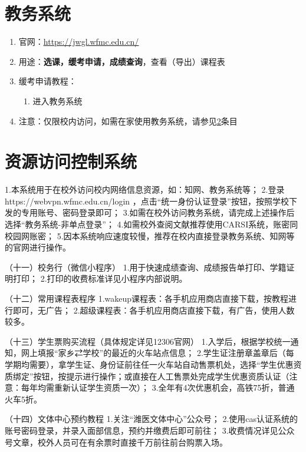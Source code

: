 \section[教务系统]{教务系统}
\begin{enumerate}
    \item 官网：\uline{\href{https://jwgl.wfmc.edu.cn/}{https://jwgl.wfmc.edu.cn/}}
    \item 用途：\textbf{选课，缓考申请，成绩查询}，查看（导出）课程表
    \item 缓考申请教程：
    \begin{enumerate}
        \item 进入教务系统
    \end{enumerate}
    \item 注意：仅限校内访问，如需在家使用教务系统，请参见\uline{\ref{cas_system}}条目
\end{enumerate}

\section[资源访问控制系统]{资源访问控制系统}
\label{cas_system}

1.本系统用于在校外访问校内网络信息资源，如：知网、教务系统等；
2.登录 https://webvpn.wfmc.edu.cn/login ，点击“统一身份认证登录”按钮，按照学校下发的专用账号、密码登录即可；
3.如需在校外访问教务系统，请完成上述操作后选择“教务系统-非单点登录”；
4.如需校外查阅文献推荐使用CARSI系统，账密同校园网账密；
5.因本系统响应速度较慢，推荐在校内直接登录教务系统、知网等的官网进行操作。

（十一）校务行（微信小程序）
1.用于快速成绩查询、成绩报告单打印、学籍证明打印；
2.打印的收费标准详见小程序内部说明。

（十二）常用课程表程序
1.wakeup课程表：各手机应用商店直接下载，按教程进行即可，无广告；
2.超级课程表：各手机应用商店直接下载，有广告，使用人数较多。

（十三）学生票购买流程（具体规定详见12306官网）
1.入学后，根据学校统一通知，网上填报“家乡⇄学校”的最近的火车站点信息；
2.学生证注册章盖章后（每学期均需要），拿学生证、身份证前往任一火车站自动售票机处，选择“学生优惠资质绑定”按钮，按提示进行操作；或直接在人工售票处完成学生优惠资质认证（注意：每年均需重新认证学生资质一次）；
3.全年有4次优惠机会，高铁75折，普通火车5折。

（十四）文体中心预约教程
1.关注“潍医文体中心”公众号；
2.使用cas认证系统的账号密码登录，并录入面部信息，预约并缴费后即可前往；
3.收费情况详见公众号文章，校外人员可在有余票时直接千万前往前台购票入场。